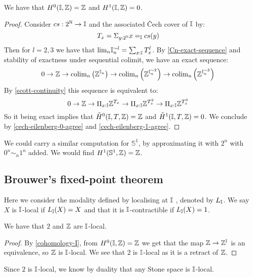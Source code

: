 \begin{proposition}\label{cohomology-I}
We have that $H^0(\mathbb{I},\mathbb{Z}) = \mathbb{Z}$ and $H^1(\mathbb{I},\mathbb{Z}) = 0$.
\end{proposition}

\begin{proof}
Consider $cs:2^{\mathbb{N}}\to\mathbb{I}$ and the associated \v{C}ech cover of $\mathbb{I}$ by: 
\[T_x = \Sigma_{y:2^{\mathbb{N}}} x=_{\mathbb{I}} cs(y)\]
Then for $l=2,3$ we have that $\mathrm{lim}_n\mathbb{I}_n^{\sim l} = \sum_{x:\mathbb{I}} T_x^l$. By \cref{Cn-exact-sequence} and stability of exactness under sequential colimit, we have an exact sequence:
\[ 0\to \mathbb{Z}\to \mathrm{colim}_n \left(\mathbb{Z}^{\mathbb{I}_n}\right) \to \mathrm{colim}_n \left(\mathbb{Z}^{\mathbb{I}_n^{\sim2}}\right)\to \mathrm{colim}_n \left(\mathbb{Z}^{\mathbb{I}_n^{\sim3}}\right)\]
By \cref{scott-continuity} this sequence is equivalent to:
\[ 0\to \mathbb{Z}\to \Pi_{x:\mathbb{I}}\mathbb{Z}^{T_x} \to  \Pi_{x:\mathbb{I}}\mathbb{Z}^{T_x^2} \to  \Pi_{x:\mathbb{I}}\mathbb{Z}^{T_x^3}\]
So it being exact implies that $\check{H}^0(\mathbb{I},T,\mathbb{Z}) = \mathbb{Z}$ and $\check{H}^1(\mathbb{I},T,\mathbb{Z}) = 0$.
We conclude by \cref{cech-eilenberg-0-agree} and \cref{cech-eilenberg-1-agree}.
\end{proof}

\begin{remark}
We could carry a similar computation for $\mathbb{S}^1$, by approximating it with $2^n$ with $0^n\sim_n1^n$ added. We would find $H^1(\mathbb{S}^1,\mathbb{Z})=\mathbb{Z}$.
\end{remark}


\subsection{Brouwer's fixed-point theorem}

Here we consider the modality defined by localising at $\mathbb{I}$ \cite{modalities}, denoted by $L_{\mathbb{I}}$. We say $X$ is $\mathbb{I}$-local if $L_{\mathbb{I}}(X) = X$ and that it is $\mathbb{I}$-contractible if $L_{\mathbb{I}}(X)=1$.

\begin{lemma}\label{Z-I-local}
We have that $2$ and $\mathbb{Z}$ are $\mathbb{I}$-local.
\end{lemma}

\begin{proof}
By \cref{cohomology-I}, from $H^0(\mathbb{I},\mathbb{Z})=\mathbb{Z}$ we get that the map $\mathbb{Z}\to \mathbb{Z}^{\mathbb{I}}$ is an equivalence, so $\mathbb{Z}$ is $\mathbb{I}$-local. We see that $2$ is $\mathbb{I}$-local as it is a retract of $\mathbb{Z}$.
\end{proof}

\begin{remark}
Since $2$ is $\mathbb{I}$-local, we know by duality that any Stone space is $\mathbb{I}$-local.
\end{remark}

